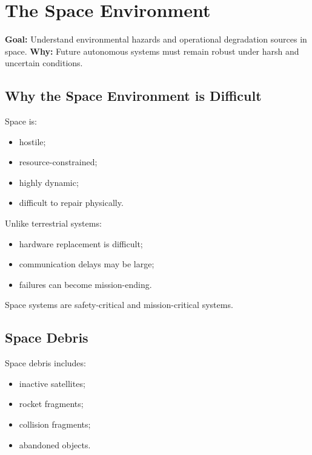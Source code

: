 \documentclass[10pt,a4paper,twocolumn]{article}
\newcommand{\lesson}[3]{
\section{#1}
\noindent
\textbf{Goal:} #2 \newline
\textbf{Why:} #3
\vspace{0.1em}
}
\begin{document}
\lesson
{The Space Environment}
{Understand environmental hazards and operational degradation sources in space.}
{Future autonomous systems must remain robust under harsh and uncertain conditions.}


\subsection{Why the Space Environment is Difficult}

Space is:
\begin{itemize}
    \item hostile;
    \item resource-constrained;
    \item highly dynamic;
    \item difficult to repair physically.
\end{itemize}

Unlike terrestrial systems:
\begin{itemize}
    \item hardware replacement is difficult;
    \item communication delays may be large;
    \item failures can become mission-ending.
\end{itemize}

\begin{warningbox}
    Space systems are safety-critical and mission-critical systems.
\end{warningbox}


\subsection{Space Debris}

Space debris includes:
\begin{itemize}
    \item inactive satellites;
    \item rocket fragments;
    \item collision fragments;
    \item abandoned objects.
\end{itemize}
\end{document}
